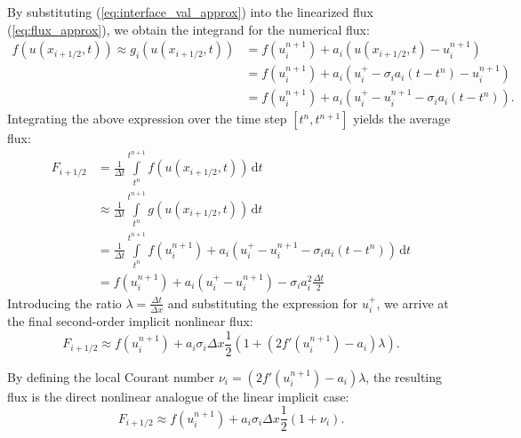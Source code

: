 By substituting (\ref{eq:interface_val_approx}) into the linearized flux (\ref{eq:flux_approx}), we obtain the integrand for the numerical flux:
\begin{equation}
    \begin{split}
        f(u(x_{i+1/2},t)) \approx g_i \left( u(x_{i+1/2}, t) \right)
        &= f(u_{i}^{n+1}) + a_i \left( u(x_{i+1/2}, t) - u_{i}^{n+1} \right) \\
        &= f(u_{i}^{n+1}) + a_i \left( u_i^+ - \sigma_i a_i \left( t - t^n \right) - u_{i}^{n+1} \right) \\
        &= f(u_{i}^{n+1}) + a_i \left( u_i^+ - u_{i}^{n+1} - \sigma_i a_i \left( t - t^n \right) \right).
    \end{split}
\end{equation}
Integrating the above expression over the time step \([t^{n}, t^{n+1}]\) yields the average flux:
\begin{equation}
    \begin{split}
        F_{i+1/2} &= \frac{1}{\Delta t} \int\limits_{t^{n}}^{t^{n+1}} f(u(x_{i+1/2},t)) \,\mathrm{d}t \\
                  &\approx \frac{1}{\Delta t} \int\limits_{t^{n}}^{t^{n+1}} g(u(x_{i+1/2},t)) \,\mathrm{d}t \\
                  &= \frac{1}{\Delta t} \int\limits_{t^{n}}^{t^{n+1}}
                  f(u_{i}^{n+1}) + a_i \left( u_i^+ - u_{i}^{n+1} - \sigma_i a_i \left( t - t^n \right) \right)
                  \,\mathrm{d}t \\
                  &= f(u_{i}^{n+1}) + a_i \left( u_i^+ - u_{i}^{n+1} \right) - \sigma_i a_i^2 \frac{\Delta t}{2}
    \end{split}
\end{equation}
Introducing the ratio \(\lambda = \frac{\Delta t}{\Delta x}\) and substituting the expression for \(u_i^+\), we arrive at the final second-order implicit nonlinear flux:
\begin{equation}
    \label{eq:second_order_nonlinear_flux}
    F_{i+1/2} \approx f(u_{i}^{n+1}) +
    a_i \sigma_i \Delta x \frac{1}{2} \left(
    1 + (2 f'(u_{i}^{n+1}) - a_i) \lambda
\right).
\end{equation}

By defining the local Courant number \(\nu_i = (2 f'(u_{i}^{n+1}) - a_i) \lambda\), the resulting flux is the direct nonlinear analogue of the linear implicit case:
\[
    F_{i+1/2} \approx f(u_{i}^{n+1}) +
    a_i \sigma_i \Delta x \frac{1}{2} \left(
    1 + \nu_i \right).
\]

